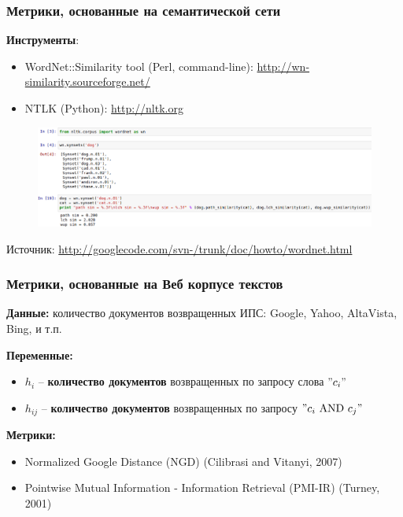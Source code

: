 \begin{frame}
\frametitle{Метрики, основанные на семантической сети}

\textbf{Инструменты}:

\begin{itemize}
\item WordNet::Similarity tool (Perl, command-line): \url{http://wn-similarity.sourceforge.net/}

\item NTLK (Python): \url{http://nltk.org}

\end{itemize}

\begin{figure}
\includegraphics[width=1.0\textwidth]{./figures/python-example}
\end{figure}

\tiny{
Источник: \url{http://googlecode.com/svn-/trunk/doc/howto/wordnet.html}
}


\end{frame}







\begin{frame}
\frametitle{Метрики, основанные на Веб корпусе текстов }

\textbf{Данные:} количество документов возвращенных ИПС: Google, 
Yahoo, AltaVista, Bing, и т.п.
    
\textbf{Переменные:} 
\begin{itemize}
    \item $h_i$ -- \textbf{количество документов} возвращенных по запросу слова
    $"c_i"$
    \item $h_{ij}$ -- \textbf{количество документов} возвращенных по запросу $"c_i \text{ AND } c_j"$
\end{itemize}

\textbf{Метрики:} 
\begin{itemize}
\item Normalized Google Distance (NGD) (Cilibrasi and Vitanyi, 2007)
\item Pointwise Mutual Information - Information Retrieval (PMI-IR) (Turney,
2001)
\end{itemize}
\end{frame}








